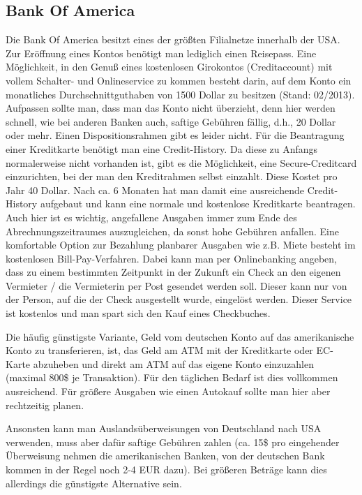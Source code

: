 \documentclass[a4paper]{scrreprt}
\begin{document}
\subsection{Bank Of America}  %
Die Bank Of America besitzt eines der gr\"o\ss{}ten Filialnetze innerhalb der USA. Zur Er\"offnung eines Kontos ben\"otigt man lediglich einen Reisepass. Eine M\"oglichkeit, in den Genu\ss{} eines kostenlosen Girokontos (Creditaccount) mit vollem Schalter- und Onlineservice zu kommen besteht darin, auf dem Konto ein monatliches Durchschnittguthaben von 1500 Dollar zu besitzen (Stand: 02/2013). Aufpassen sollte man, dass man das Konto nicht \"uberzieht, denn hier werden schnell, wie bei anderen Banken auch, saftige Geb\"uhren f\"allig, d.h., 20 Dollar oder mehr. Einen Dispositionsrahmen gibt es leider nicht. F\"ur die Beantragung einer Kreditkarte ben\"otigt man eine Credit-History. Da diese zu Anfangs normalerweise nicht vorhanden ist, gibt es die M\"oglichkeit, eine Secure-Creditcard einzurichten, bei der man den Kreditrahmen selbst einzahlt. Diese Kostet pro Jahr 40 Dollar. Nach ca. 6 Monaten hat man damit eine ausreichende Credit-History aufgebaut und kann eine normale und kostenlose Kreditkarte beantragen. Auch hier ist es wichtig, angefallene Ausgaben immer zum Ende des Abrechnungszeitraumes auszugleichen, da sonst hohe Geb\"uhren anfallen.
Eine komfortable Option zur Bezahlung planbarer Ausgaben wie z.B. Miete besteht im kostenlosen Bill-Pay-Verfahren. Dabei kann man per Onlinebanking angeben, dass zu einem bestimmten Zeitpunkt in der Zukunft ein Check an den eigenen Vermieter / die Vermieterin per Post gesendet werden soll. Dieser kann nur von der Person, auf die der Check ausgestellt wurde, eingel\"ost werden. Dieser Service ist kostenlos und man spart sich den Kauf eines Checkbuches.




Die häufig günstigste Variante, Geld vom deutschen Konto auf das amerikanische Konto zu transferieren, ist, das Geld am ATM mit der Kreditkarte oder EC-Karte abzuheben und direkt am ATM auf das eigene Konto einzuzahlen (maximal 800\$ je Transaktion). Für den täglichen Bedarf ist dies vollkommen ausreichend. Für größere Ausgaben wie einen Autokauf sollte man hier aber rechtzeitig planen.

Ansonsten kann man Auslandsüberweisungen von Deutschland nach USA verwenden, muss aber dafür saftige Gebühren zahlen (ca. 15\$ pro eingehender Überweisung nehmen die amerikanischen Banken, von der deutschen Bank kommen in der Regel noch 2-4 EUR dazu). Bei größeren Beträge kann dies allerdings die günstigste Alternative sein.
\end{document}

